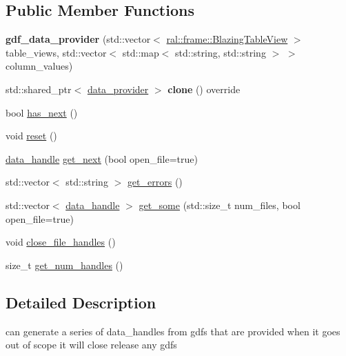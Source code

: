 \subsection*{Public Member Functions}
\begin{DoxyCompactItemize}
\item 
\mbox{\label{classral_1_1io_1_1gdf__data__provider_a885555c9892f728d166a8b428be1faa8}} 
{\bfseries gdf\+\_\+data\+\_\+provider} (std\+::vector$<$ \hyperlink{classral_1_1frame_1_1BlazingTableView}{ral\+::frame\+::\+Blazing\+Table\+View} $>$ table\+\_\+views, std\+::vector$<$ std\+::map$<$ std\+::string, std\+::string $>$ $>$ column\+\_\+values)
\item 
\mbox{\label{classral_1_1io_1_1gdf__data__provider_a00dc20eb09d4ef4578d31fd2ed5cc051}} 
std\+::shared\+\_\+ptr$<$ \hyperlink{classral_1_1io_1_1data__provider}{data\+\_\+provider} $>$ {\bfseries clone} () override
\item 
bool \hyperlink{classral_1_1io_1_1gdf__data__provider_af7ad84e9da11d439efe9328db3531855}{has\+\_\+next} ()
\item 
void \hyperlink{classral_1_1io_1_1gdf__data__provider_a6bd49396fc1bdeacd68566915e29a15f}{reset} ()
\item 
\hyperlink{structral_1_1io_1_1data__handle}{data\+\_\+handle} \hyperlink{classral_1_1io_1_1gdf__data__provider_a6770bc3c6f51365ecd3c7cc16babb7ff}{get\+\_\+next} (bool open\+\_\+file=true)
\item 
std\+::vector$<$ std\+::string $>$ \hyperlink{classral_1_1io_1_1gdf__data__provider_a31af9987a3a5e548954ea5597622b61f}{get\+\_\+errors} ()
\item 
std\+::vector$<$ \hyperlink{structral_1_1io_1_1data__handle}{data\+\_\+handle} $>$ \hyperlink{classral_1_1io_1_1gdf__data__provider_a26fdba323411bb0b8270f735e6e5ee77}{get\+\_\+some} (std\+::size\+\_\+t num\+\_\+files, bool open\+\_\+file=true)
\item 
void \hyperlink{classral_1_1io_1_1gdf__data__provider_a4a78cce759b9bee4d09ceee3014644d2}{close\+\_\+file\+\_\+handles} ()
\item 
size\+\_\+t \hyperlink{classral_1_1io_1_1gdf__data__provider_a681eb5bce251e2dc1895a2941d41931f}{get\+\_\+num\+\_\+handles} ()
\end{DoxyCompactItemize}


\subsection{Detailed Description}
can generate a series of data\+\_\+handles from gdfs that are provided when it goes out of scope it will close release any gdfs 

